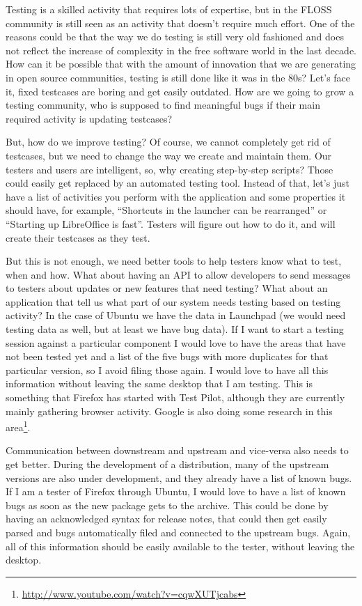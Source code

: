 Testing is a skilled activity that requires lots of expertise, but in the FLOSS community is still seen as an activity that doesn't require much effort. One of the reasons could be that the way we do testing is still very old fashioned and does not reflect the increase of complexity in the free software world in the last decade. How can it be possible that with the amount of innovation that we are generating in open source communities, testing is still done like it was in the 80s? Let's face it, fixed testcases are boring and get easily outdated. How are we going to grow a testing community, who is supposed to find meaningful bugs if their main required activity is updating testcases?

But, how do we improve testing? Of course, we cannot completely get rid of testcases, but we need to change the way we create and maintain them. Our testers and users are intelligent, so, why creating step-by-step scripts? Those could easily get replaced by an automated testing tool. Instead of that, let's just have a list of activities you perform with the application and some properties it should have, for example, ``Shortcuts in the launcher can be rearranged'' or ``Starting up LibreOffice is fast''. Testers will figure out how to do it, and will create their testcases as they test.

But this is not enough, we need better tools to help testers know what to test, when and how.  What about having an API to allow developers to send messages to testers about updates or new features that need testing? What about an application that tell us what part of our system needs testing based on testing activity? In the case of Ubuntu we have the data in Launchpad (we would need testing data as well, but at least we have bug data). If I want to start a testing session against a particular component I would love to have the areas that have not been tested yet and a list of the five bugs with more duplicates for that particular version, so I avoid filing those again. I would love to have all this information without leaving the same desktop that I am testing. This is something that Firefox has started with Test Pilot, although they are currently mainly gathering browser activity. Google is also doing some research in this area\footnote{\url{http://www.youtube.com/watch?v=cqwXUTjcabs}}.

Communication between downstream and upstream and vice-versa also needs to get better. During the development of a distribution, many of the upstream versions are also under development, and they already have a list of known bugs. If I am a tester of Firefox through Ubuntu, I would love to have a list of known bugs as soon as the new package gets to the archive. This could be done by having an acknowledged syntax for release notes, that could then get easily parsed and bugs automatically filed and connected to the upstream bugs. Again, all of this information should be easily available to the tester, without leaving the desktop.

